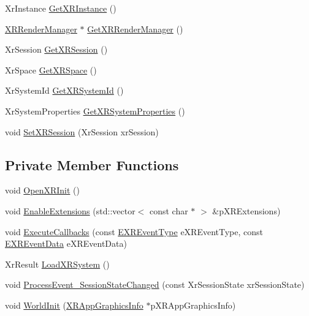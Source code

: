 \begin{DoxyCompactItemize}
\item 
Xr\+Instance \mbox{\hyperlink{class_open_x_r_provider_1_1_x_r_provider_ae83367900d79cacfa6ad3ad78e8bb400}{Get\+X\+R\+Instance}} ()
\item 
\mbox{\hyperlink{class_open_x_r_provider_1_1_x_r_render_manager}{X\+R\+Render\+Manager}} $\ast$ \mbox{\hyperlink{class_open_x_r_provider_1_1_x_r_provider_ad52ba9333ec9c84e0e2476e822982c49}{Get\+X\+R\+Render\+Manager}} ()
\item 
Xr\+Session \mbox{\hyperlink{class_open_x_r_provider_1_1_x_r_provider_afc3d098badae996ec4f44db94e9a954c}{Get\+X\+R\+Session}} ()
\item 
Xr\+Space \mbox{\hyperlink{class_open_x_r_provider_1_1_x_r_provider_ac5e378a262f30cb57f45bee1508d74de}{Get\+X\+R\+Space}} ()
\item 
Xr\+System\+Id \mbox{\hyperlink{class_open_x_r_provider_1_1_x_r_provider_a0822cb021219722a9fb6231af4170815}{Get\+X\+R\+System\+Id}} ()
\item 
Xr\+System\+Properties \mbox{\hyperlink{class_open_x_r_provider_1_1_x_r_provider_aa5396c861be5f6a445095a8a346b62c9}{Get\+X\+R\+System\+Properties}} ()
\item 
void \mbox{\hyperlink{class_open_x_r_provider_1_1_x_r_provider_a96ffa9e4f37cc4967cf41fce027e5234}{Set\+X\+R\+Session}} (Xr\+Session xr\+Session)
\end{DoxyCompactItemize}
\subsection*{Private Member Functions}
\begin{DoxyCompactItemize}
\item 
void \mbox{\hyperlink{class_open_x_r_provider_1_1_x_r_provider_a025a4e745f1381fb831ee41472491e25}{Open\+X\+R\+Init}} ()
\item 
void \mbox{\hyperlink{class_open_x_r_provider_1_1_x_r_provider_a7fa8746b23be4c5af8a067e673cdf230}{Enable\+Extensions}} (std\+::vector$<$ const char $\ast$ $>$ \&p\+X\+R\+Extensions)
\item 
void \mbox{\hyperlink{class_open_x_r_provider_1_1_x_r_provider_a12702a0d244674e54443ccf5053a3efb}{Execute\+Callbacks}} (const \mbox{\hyperlink{namespace_open_x_r_provider_aa80d286c249d35071f2ff4d19d9dc4c3}{E\+X\+R\+Event\+Type}} e\+X\+R\+Event\+Type, const \mbox{\hyperlink{namespace_open_x_r_provider_a45de367abcea927b192e21d1c8b9853d}{E\+X\+R\+Event\+Data}} e\+X\+R\+Event\+Data)
\item 
Xr\+Result \mbox{\hyperlink{class_open_x_r_provider_1_1_x_r_provider_a1bd2735b39ea943cd9e436bb0650bc43}{Load\+X\+R\+System}} ()
\item 
void \mbox{\hyperlink{class_open_x_r_provider_1_1_x_r_provider_ad8bb9f4fcd7a16440f89d3ad0b54b17b}{Process\+Event\+\_\+\+Session\+State\+Changed}} (const Xr\+Session\+State xr\+Session\+State)
\item 
void \mbox{\hyperlink{class_open_x_r_provider_1_1_x_r_provider_a381bae7b1021638036878cad1c0ea3c2}{World\+Init}} (\mbox{\hyperlink{struct_open_x_r_provider_1_1_x_r_app_graphics_info}{X\+R\+App\+Graphics\+Info}} $\ast$p\+X\+R\+App\+Graphics\+Info)
\end{DoxyCompactItemize}
